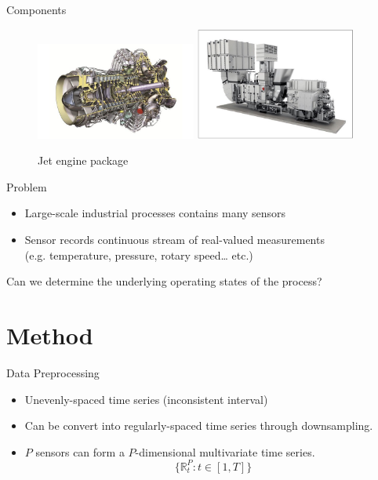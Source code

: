 \documentclass{beamer}
\begin{document}
\begin{frame}{Components}
  \begin{figure}
    \centering
    \includegraphics[width=0.47\textwidth]{rb211.jpg}
    \hfill
    \includegraphics[width=0.47\textwidth]{rb211_package.jpg}
    \caption{Jet engine package}
  \end{figure}
\end{frame}



\begin{frame}{Problem}
  \begin{itemize}
    \item Large-scale industrial processes contains many sensors
    \item Sensor records continuous stream of real-valued measurements \\
          (e.g. temperature, pressure, rotary speed… etc.)
  \end{itemize}
  \begin{tcolorbox}[title=Research Question]
    Can we determine the underlying operating states of the process?
  \end{tcolorbox}
\end{frame}

\section{Method}

\begin{frame}{Data Preprocessing}
  \begin{itemize}
    \item Unevenly-spaced time series (inconsistent interval)
    \item Can be convert into regularly-spaced time series through downsampling.
    \item \(P\) sensors can form a \(P\)-dimensional multivariate time series.
    \[ \{ \mathbb{R}_t^P:t\in [1,T] \} \]
  \end{itemize}
\end{frame}
\end{document}
